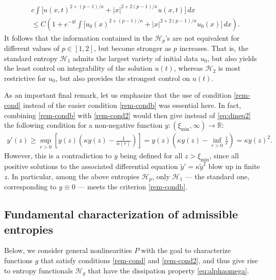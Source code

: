\documentclass[reqno]{amsart}
\newcommand{\R}{\mathbb{R}}
\begin{document}
\begin{align*}
    &c\int \big[u(x,t)^{2+(p-1)/\kappa}+|x|^{2+2(p-1)/\kappa}u(x,t)\big]\,dx \\
    &\le C\left(1+e^{-4t}\int \big[u_0(x)^{2+(p-1)/\kappa}+|x|^{2+2(p-1)/\kappa}u_0(x)\big]\,dx\right).
\end{align*}
It follows that the information contained in the $\mathcal H_p$'s are not equivalent for different values of $p\in[1,2]$, but become stronger as $p$ increases. That is, the standard entropy $\mathcal H_1$ admits the largest variety of initial data $u_0$, but also yields the least control on integrability of the solution $u(t)$, whereas $\mathcal H_2$ is most restrictive for $u_0$, but also provides the strongest control on $u(t)$.

As an important final remark, let us emphasize that the use of condition \eqref{rem-cond} instead of the easier condition \eqref{rem-condb} was essential here. In fact, combining \eqref{rem-condb} with \eqref{rem-cond2} would then give instead of \eqref{eq:dineq2} the following condition for a non-negative function $y:(\xi_\text{min},\infty)\to\R$:
\begin{align*}
    y'(z)\ge\sup_{r>0}\left[y(z)\left(\kappa y(z)-\frac1{\alpha(r)}\right)\right]
    = y(z)\left(\kappa y(z) - \inf_{r>0}\frac1r\right)
    = \kappa y(z)^2.
\end{align*}
However, this is a contradiction to $y$ being defined for all $z>\xi_\text{min}$, since all positive solutions to the associated differential equation $\tilde y'=\kappa\tilde y^2$ blow up in finite $z$. In particular, among the above entropies $\mathcal H_p$, only $\mathcal H_1$ --- the standard one, corresponding to $y\equiv0$ --- meets the criterion \eqref{rem-condb}.

\subsection{Fundamental characterization of admissible entropies}
Below, we consider general nonlinearities $P$ with the goal to characterize functions $g$ that satisfy conditions \eqref{rem-cond} and \eqref{rem-cond2}, and thus give rise to entropy functionals $\mathcal H_g$ that have the dissipation property \eqref{eq:alphaomega}. 
\end{document}
